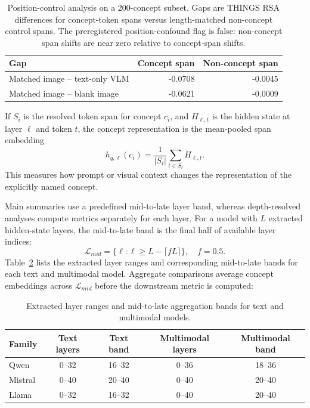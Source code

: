 \documentclass{article}
\begin{document}
\begin{table}[!htbp]
\centering
\caption{Position-control analysis on a 200-concept subset. Gaps are THINGS RSA differences for concept-token spans versus length-matched non-concept control spans. The preregistered position-confound flag is false: non-concept span shifts are near zero relative to concept-span shifts.}
\label{tab:appendix_position_control}
\begin{tabular}{lrr}
\toprule
Gap & Concept span & Non-concept span \\
\midrule
Matched image -- text-only VLM & -0.0708 & -0.0045 \\
Matched image -- blank image & -0.0621 & -0.0009 \\
\bottomrule
\end{tabular}
\end{table}

If \(S_i\) is the resolved token span for concept \(c_i\), and \(H_{\ell,t}\) is the hidden state at layer \(\ell\) and token \(t\), the concept representation is the mean-pooled span embedding
\begin{equation}
  h_{q,\ell}(c_i)=\frac{1}{|S_i|}\sum_{t\in S_i} H_{\ell,t}.
  \label{eq:appendix_pool}
\end{equation}
This measures how prompt or visual context changes the representation of the explicitly named concept.

Main summaries use a predefined mid-to-late layer band, whereas depth-resolved analyses compute metrics separately for each layer. For a model with \(L\) extracted hidden-state layers, the mid-to-late band is the final half of available layer indices:
\begin{equation}
  \mathcal{L}_{mid}=\{\ell:\ell\ge L-\lceil fL\rceil\}, \quad f=0.5.
  \label{eq:appendix_mid_layers}
\end{equation}
Table~\ref{tab:appendix_layer_bands} lists the extracted layer ranges and corresponding mid-to-late bands for each text and multimodal model. Aggregate comparisons average concept embeddings across \(\mathcal{L}_{mid}\) before the downstream metric is computed:

\begin{table}[!htbp]
\centering
\caption{Extracted layer ranges and mid-to-late aggregation bands for text and multimodal models.}
\label{tab:appendix_layer_bands}
\begin{tabular}{lcccc}
\toprule
Family & Text layers & Text band & Multimodal layers & Multimodal band \\
\midrule
Qwen & 0--32 & 16--32 & 0--36 & 18--36 \\
Mistral & 0--40 & 20--40 & 0--40 & 20--40 \\
Llama & 0--32 & 16--32 & 0--40 & 20--40 \\
\bottomrule
\end{tabular}
\end{table}
\end{document}
